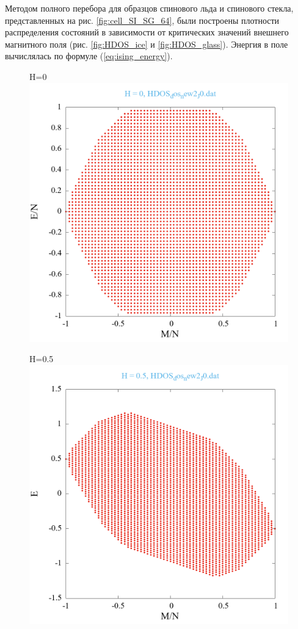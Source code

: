 \documentclass[utf8, babel, sor, jor, amsmath, amssymb, reprint]{elsarticle} %
\begin{document}
Методом полного перебора для образцов спинового льда и спинового стекла, представленных на рис. \ref{fig:cell_SI_SG_64}, были построены плотности распределения состояний в зависимости от критических значений внешнего магнитного поля (рис. \ref{fig:HDOS_ice} и \ref{fig:HDOS_glass}).
Энергия в поле вычислялась по формуле (\ref{eq:ising_energy}).



\begin{figure}[H]
	\begin{minipage}[h]{0.45\linewidth}
		\centering H=0
		\includegraphics[width=1\linewidth]{pictures/HDOS_SI_64_J0_H0.png}
	\end{minipage}
	\hfill
	\begin{minipage}[h]{0.45\linewidth}
		\centering H=0.5
		\includegraphics[width=1\linewidth]{pictures/HDOS_SI_64_J0_H0.5.png}

\end{minipage}
\end{figure}
\end{document}
